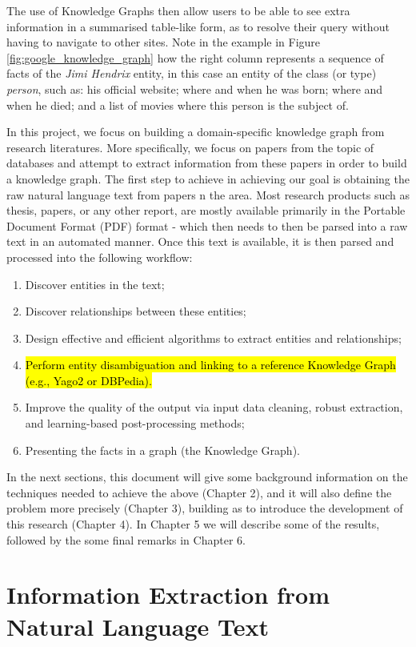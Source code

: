 \documentclass[11pt,a4paper,openright]{memoir}
\begin{document}
The use of Knowledge Graphs then allow users to be able to see extra information in a summarised table-like form, as to resolve their query without having to navigate to other sites. Note in the example in Figure \ref{fig:google_knowledge_graph} how the right column represents a sequence of facts of the \emph{Jimi Hendrix} entity, in this case an entity of the class (or type) \emph{person}, such as: his official website; where and when he was born; where and when he died; and a list of movies where this person is the subject of.

In this project, we focus on building a domain-specific knowledge graph from research literatures. More specifically, we focus on papers from the topic of databases and attempt to extract information from these papers in order to build a knowledge graph. The first step to achieve in achieving our goal is obtaining the raw natural language text from papers n the area. Most research products such as thesis, papers, or any other report, are mostly available primarily in the Portable Document Format (PDF) format \cite{pdf} - which then needs to then be parsed into a raw text in an automated manner. Once this text is available, it is then parsed and processed into the following workflow:
\begin{enumerate}
  \item Discover entities in the text;
  \item Discover relationships between these entities;
  \item Design effective and efficient algorithms to extract entities and relationships;
  \item \hl{Perform entity disambiguation and linking to a reference Knowledge Graph (e.g., Yago2 or DBPedia).}
  \item Improve the quality of the output via input data cleaning, robust extraction, and learning-based post-processing methods;
  \item Presenting the facts in a graph (the Knowledge Graph).
\end{enumerate}

In the next sections, this document will give some background information on the techniques needed to achieve the above (Chapter 2), and it will also define the problem more precisely (Chapter 3), building as to introduce the development of this research (Chapter 4). In Chapter 5 we will describe some of the results, followed by the some final remarks in Chapter 6.


\chapter{Information Extraction from Natural Language Text}
\end{document}
